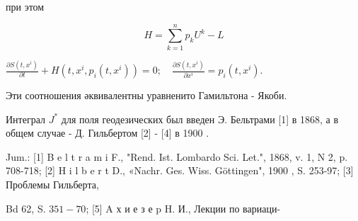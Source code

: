 \documentclass[10pt]{article}
\begin{document}
при этом



\[

H=\sum_{k=1}^{n} p_{k} U^{k}-L

\]



$\frac{\partial S\left(t, x^{i}\right)}{\partial t}+H\left(t, x^{i}, p_{i}\left(t, x^{i}\right)\right)=0 ; \quad \frac{\partial S\left(t, x^{i}\right)}{\partial x^{i}}=p_{i}\left(t, x^{i}\right)$.



Эти соотношения әквивалентны уравненито Гамильтона - Якоби.



Интеграл $J^{*}$ для поля геодезических был введен Э. Бельтрами [1] в 1868, а в общем случае - Д. Гильбертом [2] - [4] в 1900 .



Jum.: [1] B e l t r a m i F., "Rend. Ist. Lombardo Sci. Let.", 1868, v. 1, N 2, p. 708-718; [2] H i l b e r t D., «Nachr. Ges. Wiss. Göttingen", 1900 , S. 253-97; [3] Проблемы Гильберта,



Bd 62, S. $351-70$; [5] A х и е з е p H. И., Лекции по вариаци-
\end{document}

